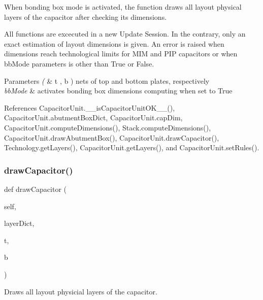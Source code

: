 When bonding box mode is activated, the function draws all layout physical layers of the capacitor after checking its dimensions. 

All functions are excecuted in a new Update Session. In the contrary, only an exact estimation of layout dimensions is given. An error is raised when dimensions reach technological limits for M\+IM and P\+IP capacitors or when {\ttfamily bb\+Mode} parameters is other than {\ttfamily True} or {\ttfamily False}.


\begin{DoxyParams}{Parameters}
{\em (} & t , b ) nets of top and bottom plates, respectively \\
\hline
{\em bb\+Mode} & activates bonding box dimensions computing when set to {\ttfamily True} \\
\hline
\end{DoxyParams}


References Capacitor\+Unit.\+\_\+\+\_\+is\+Capacitor\+Unit\+O\+K\+\_\+\+\_\+(), Capacitor\+Unit.\+abutment\+Box\+Dict, Capacitor\+Unit.\+cap\+Dim, Capacitor\+Unit.\+compute\+Dimensions(), Stack.\+compute\+Dimensions(), Capacitor\+Unit.\+draw\+Abutment\+Box(), Capacitor\+Unit.\+draw\+Capacitor(), Technology.\+get\+Layers(), Capacitor\+Unit.\+get\+Layers(), and Capacitor\+Unit.\+set\+Rules().

\mbox{\label{classpython_1_1capacitorunit_1_1CapacitorUnit_aeef7d302c356dc7036c732e114bb1616}} 
\subsubsection{\texorpdfstring{draw\+Capacitor()}{drawCapacitor()}}
{\footnotesize\ttfamily def draw\+Capacitor (\begin{DoxyParamCaption}\item[{}]{self,  }\item[{}]{layer\+Dict,  }\item[{}]{t,  }\item[{}]{b }\end{DoxyParamCaption})}



Draws all layout physicial layers of the capacitor. 


